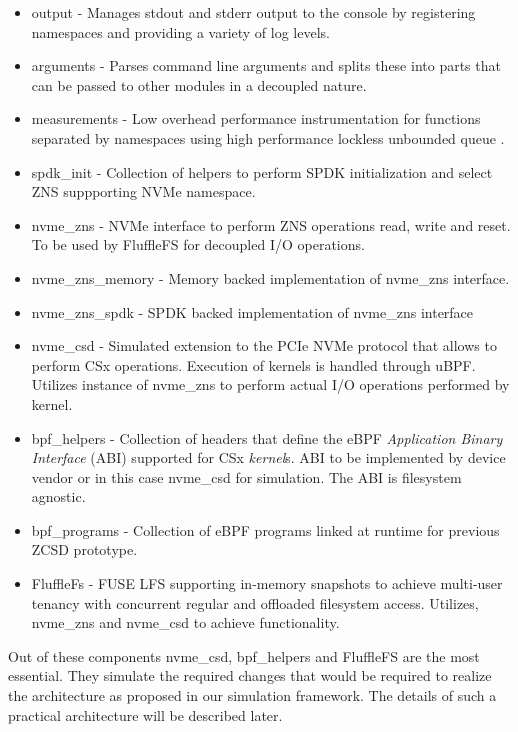 \begin{itemize}
    \item output - Manages stdout and stderr output to the console by
    registering namespaces and providing a variety of log levels.
    \item arguments - Parses command line arguments and splits these into parts
    that can be passed to other modules in a decoupled nature. 
    \item measurements - Low overhead performance instrumentation for functions
    separated by namespaces using high performance lockless unbounded queue
    \cite{Michael1996SimpleFA}.
    \item spdk\_init - Collection of helpers to perform SPDK initialization and
    select ZNS suppporting NVMe namespace.
    \item nvme\_zns - NVMe interface to perform ZNS operations read, write and
    reset. To be used by FluffleFS for decoupled I/O operations.
    \item nvme\_zns\_memory - Memory backed implementation of nvme\_zns
    interface.
    \item nvme\_zns\_spdk - SPDK backed implementation of nvme\_zns interface
    \item nvme\_csd - Simulated extension to the PCIe NVMe protocol that allows
    to perform CSx operations. Execution of kernels is handled through uBPF.
    Utilizes instance of nvme\_zns to perform actual I/O operations performed by
    kernel.
    \item bpf\_helpers - Collection of headers that define the eBPF
    \textit{Application Binary Interface} (ABI) supported for CSx
    \textit{kernel}s. ABI to be implemented by device vendor or in this
    case nvme\_csd for simulation. The ABI is filesystem agnostic.
    \item bpf\_programs - Collection of eBPF programs linked at runtime for
    previous ZCSD \cite{lukken2021zcsd} prototype.
    \item FluffleFs - FUSE LFS supporting in-memory snapshots to achieve
    multi-user tenancy with concurrent regular and offloaded filesystem access.
    Utilizes, nvme\_zns and nvme\_csd to achieve functionality.
\end{itemize}

Out of these components nvme\_csd, bpf\_helpers and FluffleFS are the most
essential. They simulate the required changes that would be required to
realize the architecture as proposed in our simulation framework. The details of
such a practical architecture will be described later.

